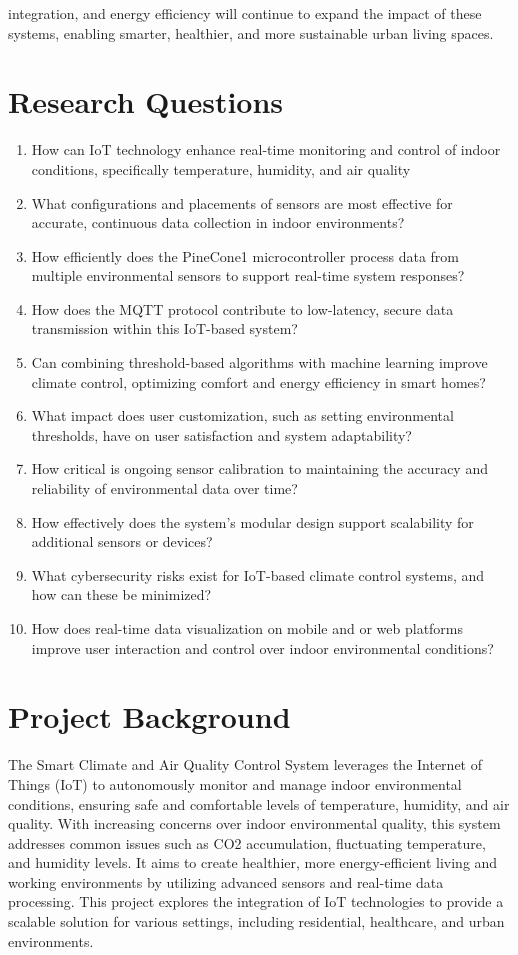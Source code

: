 \documentclass[USenglish,oneside,twocolumn]{article}
\begin{document}
integration, and energy efficiency will continue to expand the impact of these systems, enabling smarter, healthier, and more sustainable urban living spaces.

\section{Research Questions}
\begin{enumerate}
\item How can IoT technology enhance real-time monitoring and control of indoor conditions, specifically temperature, humidity, and air quality\cite{schieweck_2018_smart} 
\item What configurations and placements of sensors are most effective for accurate, continuous data collection in indoor environments? 
\item How efficiently does the PineCone1 microcontroller process data from multiple environmental sensors to support real-time system responses? 
\item How does the MQTT protocol contribute to low-latency, secure data transmission within this IoT-based system?
\item Can combining threshold-based algorithms with machine learning improve climate control, optimizing comfort and energy efficiency in smart homes? 
\item What impact does user customization, such as setting environmental thresholds, have on user satisfaction and system adaptability? 
\item How critical is ongoing sensor calibration to maintaining the accuracy and reliability of environmental data over time? 
\item How effectively does the system's modular design support scalability for additional sensors or devices? 
\item What cybersecurity risks exist for IoT-based climate control systems, and how can these be minimized? 
\item How does real-time data visualization on mobile and or web platforms improve user interaction and control over indoor environmental conditions?
\end{enumerate}

\section{Project Background}
The Smart Climate and Air Quality Control System leverages the Internet of Things (IoT) to autonomously monitor and manage indoor environmental conditions, ensuring safe and comfortable levels of temperature, humidity, and air quality. With increasing concerns over indoor environmental quality, this system addresses common issues such as CO2 accumulation, fluctuating temperature, and humidity levels. It aims to create healthier, more energy-efficient living and working environments by utilizing advanced sensors and real-time data processing. This project explores the integration of IoT technologies to provide a scalable solution for various settings, including residential, healthcare, and urban environments.
\end{document}
